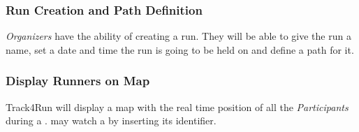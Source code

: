 \documentclass[../../rasd.tex]{subfiles}
\begin{document}
				\subsubsection{Run Creation and Path Definition}
				\textit{Organizers} have the ability of creating a run. They will be able to give the run a name, set a date and time the run is going to be held on and define a path for it.
				
				\subsubsection{Display Runners on Map}

				Track4Run will display a map with the real time position of all the \textit{Participants} during a .  may watch a  by inserting its identifier.
\end{document}
